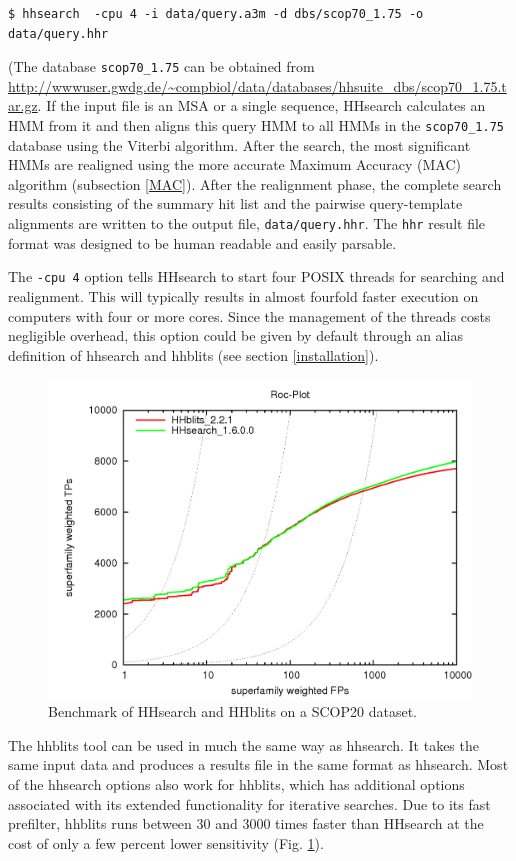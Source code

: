 \documentclass[11pt,a4paper]{article}
\begin{document}
\begin{verbatim}
$ hhsearch  -cpu 4 -i data/query.a3m -d dbs/scop70_1.75 -o data/query.hhr
\end{verbatim}

(The database \verb`scop70_1.75` can be obtained from \url{http://wwwuser.gwdg.de/~compbiol/data/databases/hhsuite_dbs/scop70_1.75.tar.gz}. 
If the input file is an MSA or a single sequence, HHsearch calculates an HMM from it
and then aligns this query HMM to all HMMs in the \verb`scop70_1.75` database using the Viterbi 
algorithm. After the search, 
the most significant HMMs are realigned using the more accurate Maximum Accuracy (MAC) 
algorithm (subsection \ref{MAC}). After the realignment phase, the complete search results consisting of the 
summary hit list and the pairwise query-template alignments are written to the output file, \verb`data/query.hhr`.
The \verb`hhr` result file format was designed to be human readable and easily parsable.

The \verb`-cpu 4` option tells HHsearch to start four POSIX threads for searching and realignment. This will typically results in almost fourfold faster execution on computers with four or more cores. Since the management of the threads costs negligible overhead, this option could be given by default through an alias definition of hhsearch and hhblits (see section \ref{installation}). 

\begin{figure}[h]
\begin{center}
\includegraphics[width=0.5 \textwidth]{hhblits-hhsearch.png}
\caption{Benchmark of HHsearch and HHblits on a SCOP20 dataset.}
\label{fig:hhsearch_hhblits_bench}
\end{center}
\end{figure}

The hhblits tool can be used in much the same way as hhsearch. 
It takes the same input data and produces a results file in the same format as hhsearch.
Most of the hhsearch options also work for hhblits, which has
additional options associated with its extended functionality for iterative searches. 
Due to its fast prefilter, hhblits runs between 30 and 3000 times faster than HHsearch
at the cost of only a few percent lower sensitivity (Fig. \ref{fig:hhsearch_hhblits_bench}).
\end{document}
